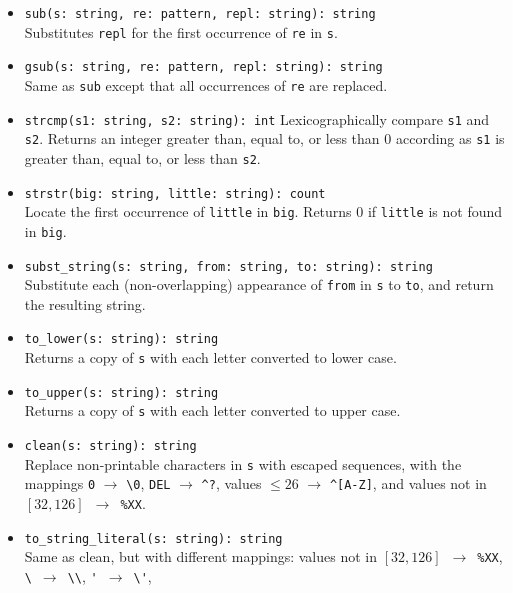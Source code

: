 \documentclass[10pt,landscape]{article}
\begin{document}
\begin{multicols*}{2}
\begin{itemize}
  \item \verb|sub(s: string, re: pattern, repl: string): string|\\
    Substitutes \texttt{repl} for the first occurrence of \texttt{re} in
    \texttt{s}.
  \item \verb|gsub(s: string, re: pattern, repl: string): string|\\
    Same as \texttt{sub} except that all occurrences of \texttt{re} are
    replaced.
  \item \verb|strcmp(s1: string, s2: string): int|
    Lexicographically compare \texttt{s1} and \texttt{s2}. Returns an integer
    greater than, equal to, or less than 0 according as \texttt{s1} is greater
    than, equal to, or less than \texttt{s2}.
  \item \verb|strstr(big: string, little: string): count|\\
    Locate the first occurrence of \texttt{little} in \texttt{big}.
    Returns 0 if \texttt{little} is not found in \texttt{big}.
  \item \verb|subst_string(s: string, from: string, to: string): string|\\
    Substitute each (non-overlapping) appearance of \texttt{from} in
    \texttt{s} to \texttt{to}, and return the resulting string.
  \item \verb|to_lower(s: string): string|\\
    Returns a copy of \texttt{s} with each letter converted to lower case.
  \item \verb|to_upper(s: string): string|\\
    Returns a copy of \texttt{s} with each letter converted to upper case.
  \item \verb|clean(s: string): string|\\
    Replace non-printable characters in \texttt{s} with escaped sequences,
    with the mappings
    \verb|0| $\rightarrow$ \verb|\0|,
    \verb|DEL| $\rightarrow$ \verb|^?|,
    values $\le 26$ $\rightarrow$ \verb|^[A-Z]|,
    and values not in $[32, 126]$~$\rightarrow$~\verb|%XX|.
  \item \verb|to_string_literal(s: string): string|\\
    Same as clean, but with different mappings:
    values not in $[32, 126]$~$\rightarrow$~\verb|%XX|,
    \verb|\|~$\rightarrow$~\verb|\\|,
    \verb|'|~$\rightarrow$~\verb|\'|,

\end{itemize}
\end{multicols*}
\end{document}
